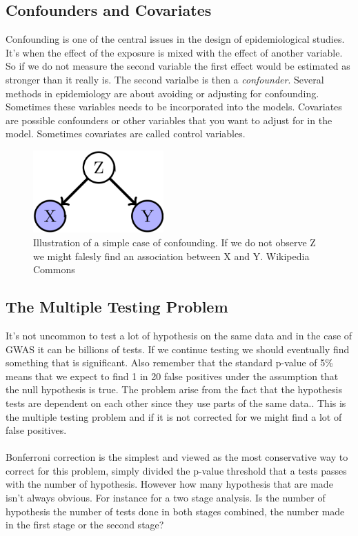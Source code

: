 \documentclass[10pt,a4paper]{article}
\begin{document}
\subsection{Confounders and Covariates}
Confounding is one of the central issues in the design of epidemiological studies. It's when the effect of the exposure is mixed with the effect of another variable. So if we do not measure the second variable the first effect would be estimated as stronger than it really is. The second varialbe is then a \emph{confounder}. Several methods in epidemiology are about avoiding or adjusting for confounding. Sometimes these variables needs to be incorporated into the models. Covariates are possible confounders or other variables that you want to adjust for in the model. Sometimes covariates are called control variables.\cite{rothman2002intro_epidemiology,rothman1998modern}

\begin{figure}[h]
    \centering
    \includegraphics[width=5cm]{Simple_Confounding_Case.png}
    \caption{Illustration of a simple case of confounding. If we do not observe Z we might falesly find an association between X and Y. Wikipedia Commons}
    \label{fig:confunding}
\end{figure}

\subsection{The Multiple Testing Problem}
It's not uncommon to test a lot of hypothesis on the same data and in the case of GWAS it can be billions of tests. If we continue testing we should eventually find something that is significant. Also remember that the standard p-value of 5\% means that we expect to find 1 in 20 false positives under the assumption that the null hypothesis is true. The problem arise from the fact that the hypothesis tests are dependent on each other since they use parts of the same data.. This is the multiple testing problem and if it is not corrected for we might find a lot of false positives.\cite{bonferroni_multiple}\\
\\
Bonferroni correction is the simplest and viewed as the most conservative way to correct for this problem, simply divided the p-value threshold that a tests passes with the number of hypothesis. However how many hypothesis that are made isn't always obvious. For instance for a two stage analysis. Is the number of hypothesis the number of tests done in both stages combined, the number made in the first stage or the second stage?\cite{bonferroni_multiple}
\end{document}
